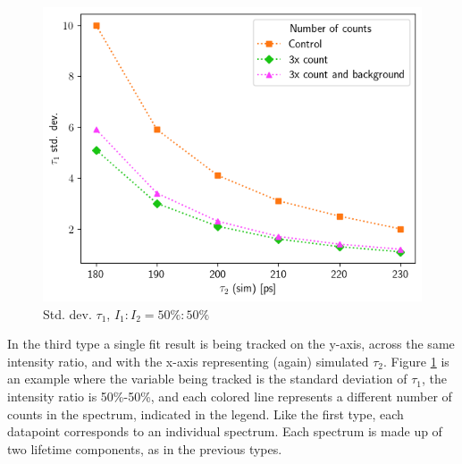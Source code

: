\begin{figure}[h]
     
    \includegraphics[width=0.6\linewidth]{Batch 5/t1-err 5050.png}
    \caption{Std. dev. $\tau_1$, $I_1:I_2 = 50\%:50\%$}
    \label{fig:type3}
\end{figure}

In the third type a single fit result is being tracked on the y-axis, across the same intensity ratio, and with the x-axis representing (again) simulated $\tau_2$. Figure \ref{fig:type3} is an example where the variable being tracked is the standard deviation of $\tau_1$, the intensity ratio is 50\%-50\%, and each colored line represents a different number of counts in the spectrum, indicated in the legend. Like the first type, each datapoint corresponds to an individual spectrum. Each spectrum is made up of two lifetime components, as in the previous types.

